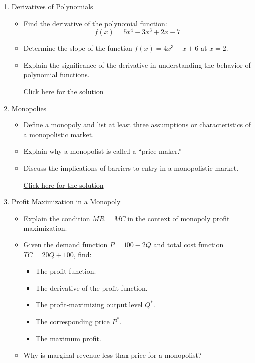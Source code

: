 \documentclass[
]{book}
\providecommand{\tightlist}{%
  \setlength{\itemsep}{0pt}\setlength{\parskip}{0pt}}
\begin{document}
\begin{enumerate}
\def\labelenumi{\arabic{enumi}.}
\tightlist
\item
  Derivatives of Polynomials

  \begin{itemize}
  \tightlist
  \item
    Find the derivative of the polynomial function:
    \[
    f(x) = 5x^4 - 3x^3 + 2x - 7
    \]
  \item
    Determine the slope of the function \(f(x) = 4x^3 - x + 6\) at \(x = 2\).
  \item
    Explain the significance of the derivative in understanding the behavior of polynomial functions.

    \href{https://youtu.be/C5jkO62wuys}{Click here for the solution}
  \end{itemize}
\item
  Monopolies

  \begin{itemize}
  \tightlist
  \item
    Define a monopoly and list at least three assumptions or characteristics of a monopolistic market.
  \item
    Explain why a monopolist is called a ``price maker.''
  \item
    Discuss the implications of barriers to entry in a monopolistic market.

    \href{https://youtu.be/MNneiFzlWIM}{Click here for the solution}
  \end{itemize}
\item
  Profit Maximization in a Monopoly

  \begin{itemize}
  \tightlist
  \item
    Explain the condition \(MR = MC\) in the context of monopoly profit maximization.
  \item
    Given the demand function \(P = 100 - 2Q\) and total cost function \(TC = 20Q + 100\), find:

    \begin{itemize}
    \tightlist
    \item
      The profit function.
    \item
      The derivative of the profit function.
    \item
      The profit-maximizing output level \(Q^*\).
    \item
      The corresponding price \(P^*\).
    \item
      The maximum profit.
    \end{itemize}
  \item
    Why is marginal revenue less than price for a monopolist?


\end{itemize}
\end{enumerate}
\end{document}

